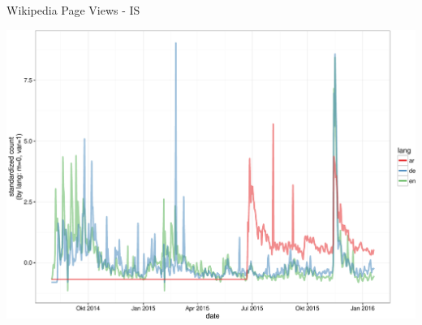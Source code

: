 \documentclass[ignorenonframetext,]{beamer}
\begin{document}
\begin{frame}{Wikipedia Page Views - IS}

\includegraphics{fig/isis-1.pdf}

\end{frame}
\end{document}

